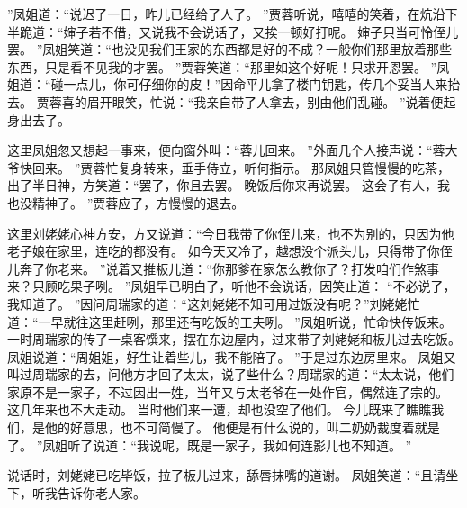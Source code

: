 ”凤姐道：“说迟了一日，昨儿已经给了人了。
”贾蓉听说，嘻嘻的笑着，在炕沿下半跪道：“婶子若不借，又说我不会说话了，又挨一顿好打呢。
婶子只当可怜侄儿罢。
”凤姐笑道：“也没见我们王家的东西都是好的不成？一般你们那里放着那些东西，只是看不见我的才罢。
”贾蓉笑道：“那里如这个好呢！只求开恩罢。
”凤姐道：“碰一点儿，你可仔细你的皮！”因命平儿拿了楼门钥匙，传几个妥当人来抬去。
贾蓉喜的眉开眼笑，忙说：“我亲自带了人拿去，别由他们乱碰。
”说着便起身出去了。
\par
这里凤姐忽又想起一事来，便向窗外叫：“蓉儿回来。
”外面几个人接声说：“蓉大爷快回来。
”贾蓉忙复身转来，垂手侍立，听何指示。
那凤姐只管慢慢的吃茶，出了半日神，方笑道：“罢了，你且去罢。
晚饭后你来再说罢。
这会子有人，我也没精神了。
”贾蓉应了，方慢慢的退去。
\par
这里刘姥姥心神方安，方又说道：“今日我带了你侄儿来，也不为别的，只因为他老子娘在家里，连吃的都没有。
如今天又冷了，越想没个派头儿，只得带了你侄儿奔了你老来。
”说着又推板儿道：“你那爹在家怎么教你了？打发咱们作煞事来？只顾吃果子咧。
”凤姐早已明白了，听他不会说话，因笑止道：
“不必说了，我知道了。
”因问周瑞家的道：“这刘姥姥不知可用过饭没有呢？”刘姥姥忙道：“一早就往这里赶咧，那里还有吃饭的工夫咧。
”凤姐听说，忙命快传饭来。
一时周瑞家的传了一桌客馔来，摆在东边屋内，过来带了刘姥姥和板儿过去吃饭。
凤姐说道：“周姐姐，好生让着些儿，我不能陪了。
”于是过东边房里来。
凤姐又叫过周瑞家的去，问他方才回了太太，说了些什么？周瑞家的道：“太太说，他们家原不是一家子，不过因出一姓，当年又与太老爷在一处作官，偶然连了宗的。
这几年来也不大走动。
当时他们来一遭，却也没空了他们。
今儿既来了瞧瞧我们，是他的好意思，也不可简慢了。
他便是有什么说的，叫二奶奶裁度着就是了。
”凤姐听了说道：“我说呢，既是一家子，我如何连影儿也不知道。
”\par
说话时，刘姥姥已吃毕饭，拉了板儿过来，舔唇抹嘴的道谢。
凤姐笑道：“且请坐下，听我告诉你老人家。
